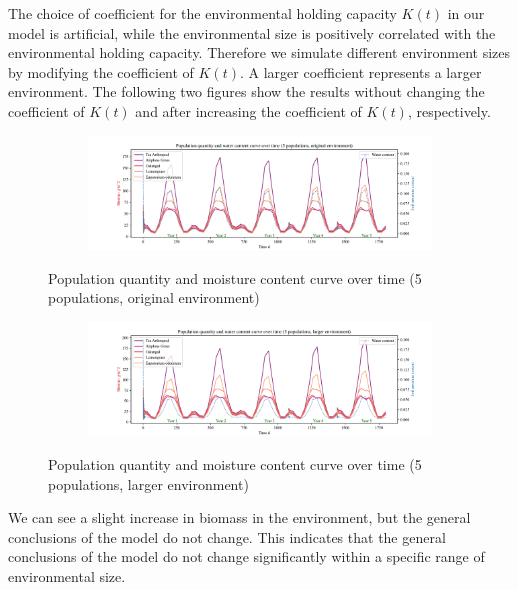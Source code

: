 \documentclass{mcmthesis}
\begin{document}
\indent

The choice of coefficient for the environmental holding capacity $K(t)$ in our model is artificial, while the environmental size is positively correlated with the environmental holding capacity. Therefore we simulate different environment sizes by modifying the coefficient of $K(t)$. A larger coefficient represents a larger environment. The following two figures show the results without changing the coefficient of $K(t)$ and after increasing the coefficient of $K(t)$, respectively.


\begin{figure}[h]
\centering 
\begin{subfigure}{ \textwidth}
\includegraphics[width=\textwidth]{img/origin_K_5.pdf}
\end{subfigure}
\caption{Population quantity and moisture content curve over time (5 populations, original environment)}
\label{fig:origin_K_5}
\end{figure}


\begin{figure}[h]
\centering 
\begin{subfigure}{ \textwidth}
\includegraphics[width=\textwidth]{img/larger_K_5.pdf}
\end{subfigure}
\caption{Population quantity and moisture content curve over time (5 populations, larger environment)}
\label{fig:larger_K_5}
\end{figure}

We can see a slight increase in biomass in the environment, but the general conclusions of the model do not change. This indicates that the general conclusions of the model do not change significantly within a specific range of environmental size.
\end{document}
